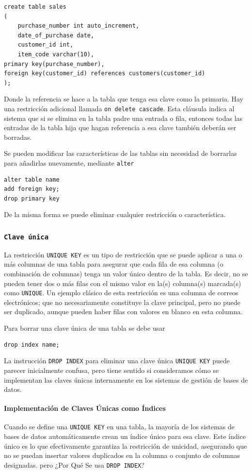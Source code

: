  \begin{verbatim}
create table sales
(
	purchase_number int auto_increment,
    date_of_purchase date,
    customer_id int,
    item_code varchar(10),
primary key(purchase_number),
foreign key(customer_id) references customers(customer_id)
);
 \end{verbatim}
 Donde la referencia se hace a la tabla que tenga esa clave como la primaria. Hay una restricción adicional llamada \texttt{on delete cascade}. Esta cláusula indica al sistema que si se elimina en la tabla padre una entrada o fila, entonces todas las entradas de la tabla hija que hagan referencia a esa clave también deberán ser borradas. 

 Se pueden modificar las características de las tablas sin necesidad de borrarlas para añadirlas nuevamente, mediante \texttt{alter}

 \begin{verbatim}
alter table name
add foreign key;
drop primary key
 \end{verbatim}
 De la misma forma se puede eliminar cualquier restricción o característica.

 \subsubsection{\texttt{Clave única}}

 La restricción \verb|UNIQUE KEY|  es un tipo de restricción que se puede aplicar a una o más columnas de una tabla para asegurar que cada fila de esa columna (o combinación de columnas) tenga un valor único dentro de la tabla. Es decir, no se pueden tener dos o más filas con el mismo valor en la(s) columna(s) marcada(s) como \verb|UNIQUE|. Un ejemplo clásico de esta restricción es una columna de correos electrónicos; que no necesariamente constituye la clave principal, pero no puede ser duplicado, aunque pueden haber filas con valores en blanco en esta columna.

 Para borrar una clave única de una tabla se debe usar
 \begin{verbatim}
drop index name;
 \end{verbatim}
 La instrucción \texttt{DROP INDEX} para eliminar una clave única \texttt{UNIQUE KEY} puede parecer inicialmente confusa, pero tiene sentido si consideramos cómo se implementan las claves únicas internamente en los sistemas de gestión de bases de datos.

\paragraph{Implementación de Claves Únicas como Índices} Cuando se define una \texttt{UNIQUE KEY} en una tabla, la mayoría de los sistemas de bases de datos automáticamente crean un índice único para esa clave. Este índice único es lo que efectivamente garantiza la restricción de unicidad, asegurando que no se puedan insertar valores duplicados en la columna o conjunto de columnas designadas. pero ¿Por Qué Se usa \texttt{DROP INDEX}?

